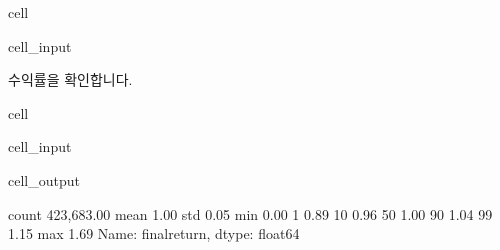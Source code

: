 \documentclass[letterpaper,10pt,english]{jupyterBook}
\begin{document}
\begin{sphinxuseclass}{cell}
\begin{sphinxVerbatimInput}
\begin{sphinxuseclass}{cell_input}
\begin{sphinxVerbatim}[commandchars=\\\{\}]
\end{sphinxVerbatim}

\end{sphinxuseclass}\end{sphinxVerbatimInput}

\end{sphinxuseclass}
\sphinxAtStartPar
 수익률을 확인합니다.

\begin{sphinxuseclass}{cell}\begin{sphinxVerbatimInput}

\begin{sphinxuseclass}{cell_input}
\begin{sphinxVerbatim}[commandchars=\\\{\}]
    
\PYG{p}{[}\PYG{p}{]}\PYG{p}{[}    \PYG{p}{]}
\end{sphinxVerbatim}

\end{sphinxuseclass}\end{sphinxVerbatimInput}
\begin{sphinxVerbatimOutput}

\begin{sphinxuseclass}{cell_output}
\begin{sphinxVerbatim}[commandchars=\\\{\}]
count   423,683.00
mean          1.00
std           0.05
min           0.00
1\PYGZpc{}            0.89
10\PYGZpc{}           0.96
50\PYGZpc{}           1.00
90\PYGZpc{}           1.04
99\PYGZpc{}           1.15
max           1.69
Name: final\PYGZus{}return, dtype: float64
\end{sphinxVerbatim}

\end{sphinxuseclass}\end{sphinxVerbatimOutput}

\end{sphinxuseclass}
\end{document}
